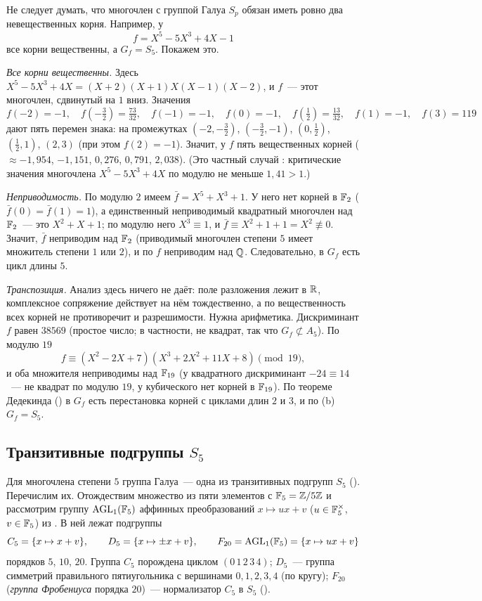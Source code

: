 \begin{remark}[4.18]
Не следует думать, что многочлен с группой Галуа $S_p$ обязан иметь ровно два невещественных корня. Например, у
\[
f=X^5-5X^3+4X-1
\]
все корни вещественны, а $G_f=S_5$. Покажем это.

\emph{Все корни вещественны.} Здесь $X^5-5X^3+4X=(X+2)(X+1)X(X-1)(X-2)$, и $f$~--- этот многочлен, сдвинутый на $1$
вниз. Значения
\[
f(-2)=-1,\quad f(-\tfrac32)=\tfrac{73}{32},\quad f(-1)=-1,\quad f(0)=-1,\quad f(\tfrac12)=\tfrac{13}{32},\quad f(1)=-1,\quad f(3)=119
\]
дают пять перемен знака: на промежутках $(-2,-\frac32)$, $(-\frac32,-1)$, $(0,\frac12)$, $(\frac12,1)$, $(2,3)$
(при этом $f(2)=-1$). Значит, у $f$ пять вещественных корней ($\approx-1{,}954$, $-1{,}151$, $0{,}276$, $0{,}791$, $2{,}038$).
(Это частный случай : критические значения многочлена $X^5-5X^3+4X$ по модулю не меньше $1{,}41>1$.)

\emph{Неприводимость.} По модулю $2$ имеем $\bar f=X^5+X^3+1$. У него нет корней в $\mathbb F_2$ ($\bar f(0)=\bar f(1)=1$), а
единственный неприводимый квадратный многочлен над $\mathbb F_2$~--- это $X^2+X+1$; по модулю него $X^3\equiv1$, и
$\bar f\equiv X^2+1+1=X^2\not\equiv0$. Значит, $\bar f$ неприводим над $\mathbb F_2$ (приводимый многочлен степени $5$ имеет
множитель степени $1$ или $2$), и по  $f$ неприводим над $\mathbb Q$. Следовательно, в $G_f$ есть цикл длины $5$.

\emph{Транспозиция.} Анализ здесь ничего не даёт: поле разложения лежит в $\mathbb R$, комплексное сопряжение действует на нём
тождественно, а по  вещественность всех корней не противоречит и разрешимости. Нужна арифметика. Дискриминант
$f$ равен $38569$ (простое число; в частности, не квадрат, так что $G_f\not\subset A_5$). По модулю $19$
\[
f\equiv(X^2-2X+7)(X^3+2X^2+11X+8)\pmod{19},
\]
и оба множителя неприводимы над $\mathbb F_{19}$ (у квадратного дискриминант $-24\equiv14$~--- не квадрат по модулю $19$, у
кубического нет корней в $\mathbb F_{19}$). По теореме Дедекинда () в $G_f$ есть перестановка корней с циклами длин $2$ и
$3$, и по (b) $G_f=S_5$.
\end{remark}

\subsection*{Транзитивные подгруппы $S_5$}

Для многочлена степени $5$ группа Галуа~--- одна из транзитивных подгрупп $S_5$ (). Перечислим их. Отождествим
множество из пяти элементов с $\mathbb F_5=\mathbb Z/5\mathbb Z$ и рассмотрим группу $\mathrm{AGL}_1(\mathbb F_5)$ аффинных преобразований
$x\mapsto ux+v$ ($u\in\mathbb F_5^\times$, $v\in\mathbb F_5$) из . В ней лежат подгруппы
\[
C_5=\{x\mapsto x+v\},\qquad D_5=\{x\mapsto\pm x+v\},\qquad F_{20}=\mathrm{AGL}_1(\mathbb F_5)=\{x\mapsto ux+v\}
\]
порядков $5$, $10$, $20$. Группа $C_5$ порождена циклом $(0\,1\,2\,3\,4)$; $D_5$~--- группа симметрий правильного
пятиугольника с вершинами $0,1,2,3,4$ (по кругу); $F_{20}$ (\emph{группа Фробениуса} порядка $20$)~--- нормализатор
$C_5$ в $S_5$ ().

